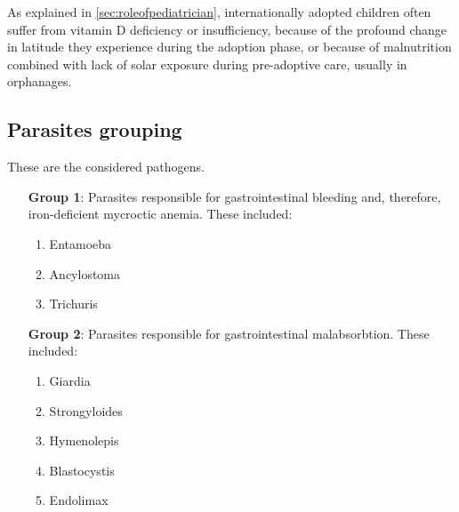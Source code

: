 As explained in \ref{sec:roleofpediatrician}, internationally adopted children often suffer from vitamin D deficiency or insufficiency, because of the profound change in latitude they experience during the adoption phase, or because of malnutrition combined with lack of solar exposure during pre-adoptive care, usually in orphanages.


\subsection{Parasites grouping}\label{sub:parasites}
These are the considered pathogens.

\begin{enumerate}[leftmargin=6em]
	\item [\textbf{Group 1}:] Parasites responsible for gastrointestinal bleeding and, therefore, iron-deficient mycroctic anemia. These included:
		\begin{enumerate}[label=\alph*)]
			\item Entamoeba
			\item Ancylostoma
			\item Trichuris
		\end{enumerate}
	\item [\textbf{Group 2}:] Parasites responsible for gastrointestinal malabsorbtion. These included:
		\begin{enumerate}[label=\alph*)]
			\item Giardia
			\item Strongyloides
			\item Hymenolepis
			\item Blastocystis
			\item Endolimax
		\end{enumerate}
\end{enumerate}


